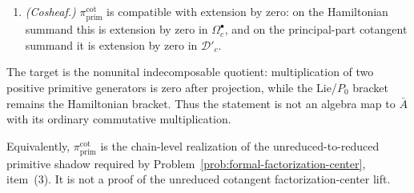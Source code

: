 \begin{thm}
\begin{enumerate}
	      Theorem~\ref{thm:reduced-principal-part-boundary-current};
	  \item \emph{(Cosheaf.)} $\pi_{\mathrm{prim}}^{\mathrm{cot}}$ is
	      compatible with extension by zero: on the Hamiltonian summand this
	      is extension by zero in \(\Omega^\bullet_c\), and on the
	      principal-part cotangent summand it is extension by zero in
	      \(\mathcal D'_c\).
  \end{enumerate}
  The target is the nonunital indecomposable quotient: multiplication
  of two positive primitive generators is zero after projection,
  while the Lie/$P_0$ bracket remains the Hamiltonian bracket.  Thus
  the statement is not an algebra map to $\bar A$ with its ordinary
  commutative multiplication.

  Equivalently, $\pi_{\mathrm{prim}}^{\mathrm{cot}}$ is the chain-level
  realization of the unreduced-to-reduced primitive shadow required by
  Problem~\ref{prob:formal-factorization-center}, item~(3). It is not a
  proof of the unreduced cotangent factorization-center lift.
\end{thm}

